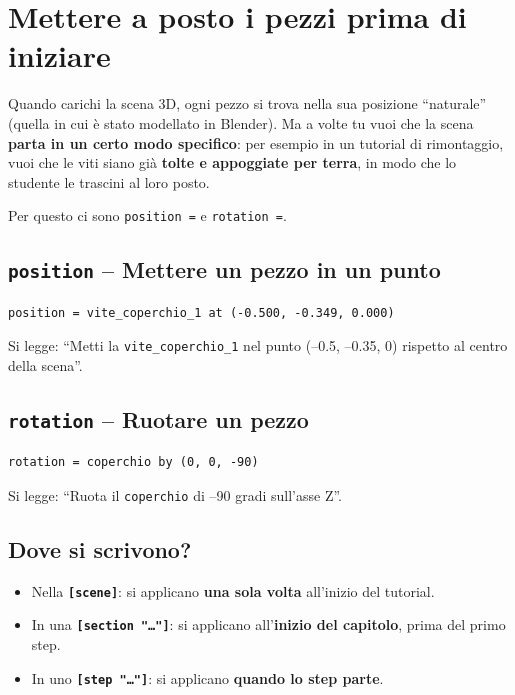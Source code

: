 ﻿\documentclass[a4paper,12pt,oneside]{book}
\newcommand{\kw}[1]{\texttt{\color{keycolor}#1}}
\newcommand{\sez}[1]{\texttt{\color{sectioncolor}\textbf{#1}}}
\begin{document}
\chapter{Mettere a posto i pezzi prima di iniziare}
\label{ch:position-rotation}

Quando carichi la scena 3D, ogni pezzo si trova nella sua posizione
``naturale'' (quella in cui è stato modellato in Blender). Ma a volte tu
vuoi che la scena \textbf{parta in un certo modo specifico}: per esempio in
un tutorial di rimontaggio, vuoi che le viti siano già \textbf{tolte e
appoggiate per terra}, in modo che lo studente le trascini al loro posto.

Per questo ci sono \kw{position =} e \kw{rotation =}.

\section{\texttt{position} -- Mettere un pezzo in un punto}

\begin{lstlisting}
position = vite_coperchio_1 at (-0.500, -0.349, 0.000)
\end{lstlisting}

Si legge: ``Metti la \texttt{vite\_coperchio\_1} nel punto (--0.5, --0.35, 0)
rispetto al centro della scena''.

\section{\texttt{rotation} -- Ruotare un pezzo}

\begin{lstlisting}
rotation = coperchio by (0, 0, -90)
\end{lstlisting}

Si legge: ``Ruota il \texttt{coperchio} di --90 gradi sull'asse Z''.

\section{Dove si scrivono?}

\begin{itemize}
  \item Nella \sez{[scene]}: si applicano \textbf{una sola volta} all'inizio del
        tutorial.
  \item In una \sez{[section "\ldots"]}: si applicano all'\textbf{inizio del
        capitolo}, prima del primo step.
  \item In uno \sez{[step "\ldots"]}: si applicano \textbf{quando lo step parte}.
\end{itemize}
\end{document}
